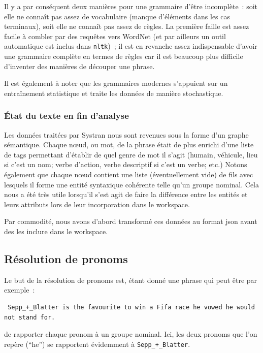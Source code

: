 \documentclass[a4paper, 12pt]{article}
\newcommand{\pyt}[1]{\texttt{#1}}%
\begin{document}
Il y a par conséquent deux manières pour une grammaire d'être incomplète~: soit elle ne connaît pas assez de vocabulaire (manque d'éléments dans les cas terminaux), soit elle ne connaît pas assez de règles. La première faille est assez facile à combler par des requêtes vers WordNet (et par ailleurs un outil automatique est inclus dans \pyt{nltk})~; il est en revanche assez indispensable d'avoir une grammaire complète en termes de règles car il est beaucoup plus difficile d'inventer des manières de découper une phrase.

Il est également à noter que les grammaires modernes s'appuient sur un entraînement statistique et traite les données de manière stochastique.

\subsubsection{\'Etat du texte en fin d'analyse}
Les données traitées par Systran nous sont revenues sous la forme d'un graphe sémantique. Chaque nœud, ou mot, de la phrase était de plus enrichi d'une liste de tags permettant d'établir de quel genre de mot il s'agit (humain, véhicule, lieu si c'est un nom; verbe d'action, verbe descriptif si c'est un verbe; etc.) Notons également que chaque nœud contient une liste (éventuellement vide) de fils avec lesquels il forme une entité syntaxique cohérente telle qu'un groupe nominal. Cela nous a été très utile lorsqu'il s'est agit de faire la différence entre les entités et leurs attributs lors de leur incorporation dans le workspace.

Par commodité, nous avons d'abord transformé ces données au format json avant des les inclure dans le workspace.

\subsection{Résolution de pronoms}

Le but de la résolution de pronoms est, étant donné une phrase qui peut être par exemple~:

\begin{verbatim}
 Sepp_+_Blatter is the favourite to win a Fifa race he vowed he would not stand for.
\end{verbatim}
de rapporter chaque pronom à un groupe nominal. Ici, les deux pronoms que l'on repère (``he'') se rapportent évidemment à \verb|Sepp_+_Blatter|.
\end{document}
